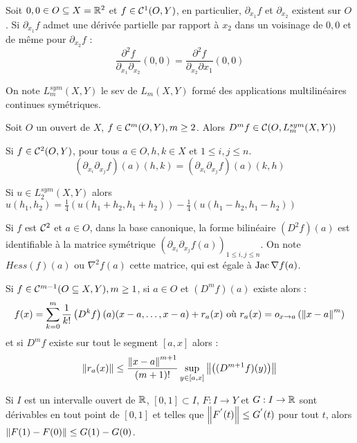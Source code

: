 \documentclass{cours}
\begin{document}
\begin{lemma}
    Soit $0, 0 \in O \subseteq X = \mathbb{R}^{2}$ et $f \in \mathcal{C}^{1}(O, Y)$, en particulier, $\partial_{x_{1}}f $ et $\partial_{x_{2}}$ existent sur $O$. Si $\partial_{x_{1}}f$ admet une dérivée partielle par rapport à $x_{2}$ dans un voisinage de $0, 0$ et de même pour $\partial_{x_{2}}f$ :
    \[
        \frac{\partial^{2}f}{\partial_{x_{1}}\partial_{x_{2}}}(0, 0) = \frac{\partial^{2}f}{\partial_{x_{2}}\partial{x_{1}}}(0, 0)
    \]
\end{lemma}

\begin{definition}
    On note $L_{m}^{sym}(X, Y)$ le sev de $L_{m}(X, Y)$ formé des applications multilinéaires continues symétriques.
\end{definition}

\begin{theorem}
    Soit $O$ un ouvert de $X$, $f \in \mathcal{C}^{m}(O, Y), m\geq 2$. Alors $D^{m}f \in \mathcal{C}(O, L_{m}^{sym}(X, Y))$
\end{theorem}

\begin{corollary}
    Si $f \in \mathcal{C}^{2}(O, Y)$, pour tous $a \in O, h, k \in X$ et $1 \leq i,j \leq n$.
    \[
        (\partial_{x_{i}}\partial_{x_{j}}f)(a)(h, k) = (\partial_{x_{i}}\partial_{x_{j}}f)(a)(k, h)
    \]
\end{corollary}

\begin{remark}
    Si $u \in L_{2}^{sym}(X, Y)$ alors $u(h_{1}, h_{2}) = \frac{1}{4}(u(h_{1} + h_{2}, h_{1} + h_{2})) - \frac{1}{4}(u(h_{1} - h_{2}, h_{1} - h_{2}))$
\end{remark}

\begin{definition}
    Si $f$ est $\mathcal{C}^{2}$ et $a \in O$, dans la base canonique, la forme bilinéaire $(D^{2}f)(a)$ est identifiable à la matrice symétrique $\left(\partial_{x_{i}}\partial_{x_{j}}f(a)\right)_{1 \leq i, j \leq n}$. On note $Hess(f)(a)$ ou $\nabla^{2}f(a)$ cette matrice, qui est égale à $\operatorname{Jac}\nabla f(a)$.
\end{definition}
\begin{theorem}
    Si $f \in \mathcal{C}^{m - 1}(O \subseteq X, Y), m\geq 1$, si $a \in O$ et $\left(D^{m}f\right)(a)$ existe alors :
    \[
        f(x) = \sum_{k = 0}^{m}\frac{1}{k!}\left(D^{k}f\right)(a)(x - a, \ldots, x - a) + r_{a}(x) \text{ où } r_{a}(x) = o_{x \rightarrow a}\left(\left\lVert x - a \right\rVert^{m}\right)
    \]
    et si $D^{m}f$ existe sur tout le segment $\left[a, x\right]$ alors :
    \[
        \left\lVert r_{a}(x) \right\rVert \leq \frac{\left\lVert x - a \right\rVert^{m + 1}}{(m + 1)!}\sup_{y \in \left[a, x\right]}\left\lVert \left((D^{m + 1}f)(y)\right) \right\rVert
    \]
\end{theorem}
\begin{lemma}
    Si $I$ est un intervalle ouvert de $\mathbb{R}$, $\left[0, 1\right] \subset I$, $F : I \rightarrow Y$ et $G : I \rightarrow \mathbb{R}$ sont dérivables en tout point de $\left[0, 1\right]$ et telles que $\left\lVert F^{'}(t) \right\rVert \leq G^{'}(t)$ pour tout $t$, alors $\left\lVert F(1) - F(0) \right\rVert \leq G(1) - G(0)$.
\end{lemma}
\end{document}
